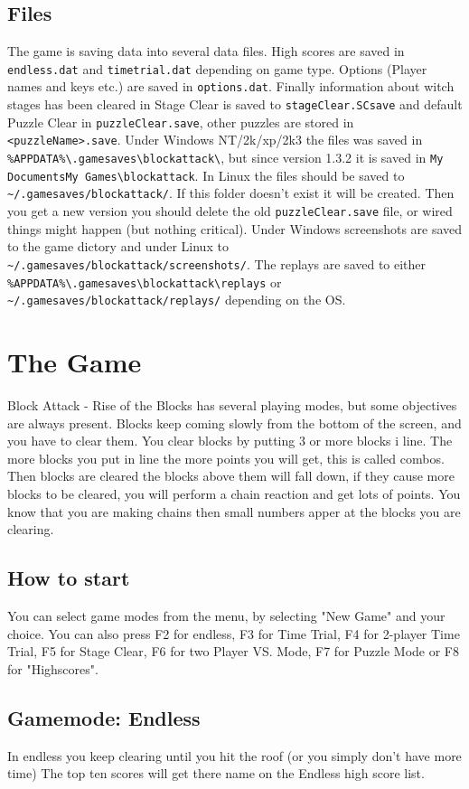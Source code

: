 \documentclass[11pt,a4paper]{article}
\begin{document}
\subsection{Files}
The game is saving data into several data files. High scores are
saved in \verb+endless.dat+ and \verb+timetrial.dat+ depending on
game type. Options (Player names and keys etc.) are saved in
\verb+options.dat+. Finally information about witch stages has
been cleared in Stage Clear is saved to \verb+stageClear.SCsave+ and
default Puzzle Clear in \verb+puzzleClear.save+, other puzzles are stored in \verb+<puzzleName>.save+. Under Windows NT/2k/xp/2k3 the files was saved in \verb+%APPDATA%\.gamesaves\blockattack\+, but since version 1.3.2 it is saved in \verb+My DocumentsMy Games\blockattack+. In Linux the files should
be saved to \verb+~/.gamesaves/blockattack/+. If this folder
doesn't exist it will be created. Then you get a new version you
should delete the old \verb+puzzleClear.save+ file, or  wired
things might happen (but nothing critical). Under Windows screenshots are saved to the game dictory and under Linux to \newline \verb+~/.gamesaves/blockattack/screenshots/+. The replays are saved to either \verb+%APPDATA%\.gamesaves\blockattack\replays+ or \\ \verb+~/.gamesaves/blockattack/replays/+ depending on the OS.
\section{The Game}
Block Attack - Rise of the Blocks has several playing modes, but
some objectives are always present. Blocks keep coming slowly from
the bottom of the screen, and you have to clear them. You clear
blocks by putting 3 or more blocks i line. The more blocks you put
in line the more points you will get, this is called combos. Then
blocks are cleared the blocks above them will fall down, if they
cause more blocks to be cleared, you will perform a chain reaction
and get lots of points. You know that you are making chains then small numbers apper at the blocks you are clearing.
\subsection{How to start}
You can select game modes from the menu, by selecting "New Game"
and your choice. You can also press F2 for endless, F3 for Time
Trial, F4 for 2-player Time Trial, F5 for Stage Clear, F6 for two
Player VS. Mode, F7 for Puzzle Mode or F8 for "Highscores".
\subsection{Gamemode: Endless}
In endless you keep clearing until you hit the roof (or you simply
don't have more time) The top ten scores will get there name on
the Endless high score list.
\end{document}
